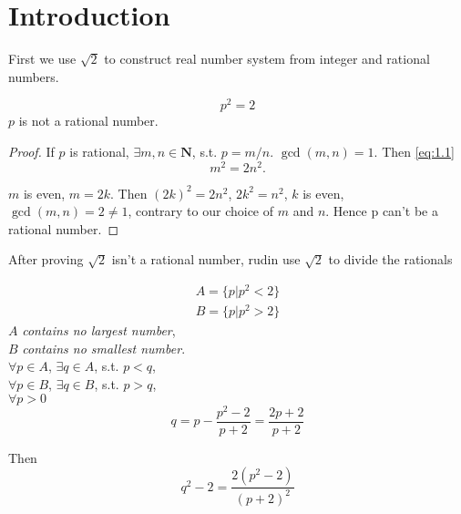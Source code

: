 \section{Introduction}
First we use $\sqrt{2}$ to construct real number system from integer and rational numbers.

\begin{newexample}
    \label{newexample:1.1}
    \begin{equation}
        \label{eq:1.1}
        p^2=2
    \end{equation}
    $p$ is not a rational number.
\end{newexample}

\begin{proof}
    If $p$ is rational,  $\exists m,n \in \mathbf{N}$,
    s.t. $p=m/n$. $\gcd (m,n) = 1$.
    Then \ref{eq:1.1}
    \begin{equation}
        \label{eq:1.2}
        m^2 = 2n^2.
    \end{equation}

    $m$ is even, $m = 2k$.
    Then $(2k)^2 = 2n^2$, $2k^2 = n^2$, $k$ is even, $\gcd (m,n)=2\neq 1$,
    contrary to our choice of $m$ and $n$. Hence p can't be a rational number.
\end{proof}

After proving $\sqrt{2}$ isn't a rational number, rudin use $\sqrt{2}$ to divide the rationals


\begin{align*}
    A = \{p|p^2<2\} \\
    B = \{p|p^2>2\}
\end{align*}
$A$ \emph{contains no largest number},\\
$B$ \emph{contains no smallest number}.\\
$\forall p\in A$, $\exists q\in A$, s.t. $p<q$,\\
$\forall p\in B$, $\exists q\in B$, s.t. $p>q$,\\
$\forall p>0$
\begin{equation}
    \label{eq:1.3}
    q = p-\frac{p^2-2}{p+2} = \frac{2p+2}{p+2}
\end{equation}

Then
\begin{equation}
    \label{eq:1.4}
    q^2 - 2 = \frac{2(p^2-2)}{(p+2)^2}
\end{equation}


